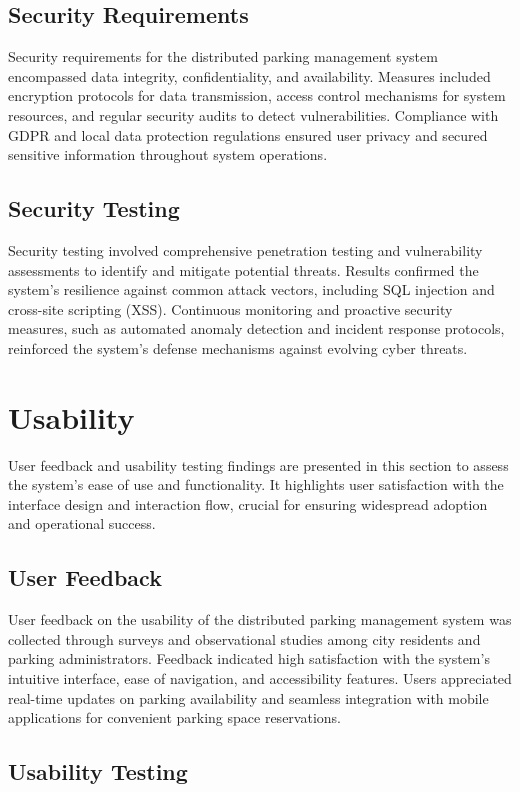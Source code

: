 \documentclass[oneside, 12pt, a4paper, draft]{book}
\begin{document}
\section{Security Requirements}
\label{sec:orgd266b2b}

Security requirements for the distributed parking management system encompassed data integrity, confidentiality, and availability. Measures included encryption protocols for data transmission, access control mechanisms for system resources, and regular security audits to detect vulnerabilities. Compliance with GDPR and local data protection regulations ensured user privacy and secured sensitive information throughout system operations.
\section{Security Testing}
\label{sec:org1073827}

Security testing involved comprehensive penetration testing and vulnerability assessments to identify and mitigate potential threats. Results confirmed the system's resilience against common attack vectors, including SQL injection and cross-site scripting (XSS). Continuous monitoring and proactive security measures, such as automated anomaly detection and incident response protocols, reinforced the system's defense mechanisms against evolving cyber threats.
\chapter{Usability}
\label{sec:org802937a}
User feedback and usability testing findings are presented in this section to assess the system's ease of use and functionality. It highlights user satisfaction with the interface design and interaction flow, crucial for ensuring widespread adoption and operational success.
\section{User Feedback}
\label{sec:org304bfba}

User feedback on the usability of the distributed parking management system was collected through surveys and observational studies among city residents and parking administrators. Feedback indicated high satisfaction with the system's intuitive interface, ease of navigation, and accessibility features. Users appreciated real-time updates on parking availability and seamless integration with mobile applications for convenient parking space reservations.
\section{Usability Testing}
\label{sec:org625155d}
\end{document}
